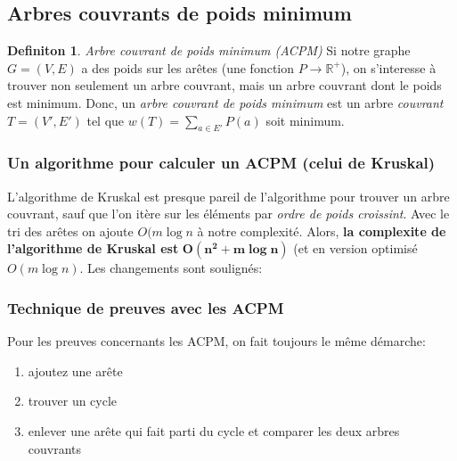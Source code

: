 \documentclass[french]{article}
\theoremstyle{definition}
\newtheorem{definition}{Definiton}[subsection]
\begin{document}
		\subsection{Arbres couvrants de poids minimum}
		\begin{definition}{\textit{Arbre couvrant de poids minimum (ACPM)}} Si notre graphe $G = (V, E)$ a des poids sur les arêtes (une fonction $P \to \mathbb{R}^+$), on s'interesse à trouver non seulement un arbre couvrant, mais un arbre couvrant dont le poids est minimum. Donc, un \textit{arbre couvrant de poids minimum} est un arbre \textit{couvrant} $T = (V', E')$ tel que $w(T) = \sum_{a \in E'}{P(a)}$ soit minimum.
		\end{definition}

		\subsubsection{Un algorithme pour calculer un ACPM (celui de Kruskal)}

		L'algorithme de Kruskal est presque pareil de l'algorithme pour trouver un arbre couvrant, sauf que l'on itère sur les éléments par \textit{ordre de poids croissint}. Avec le tri des arêtes on ajoute $O(m \log n$ à notre complexité. Alors, \textbf{la complexite de l'algorithme de Kruskal est} $\mathbf{O(n^2 + m \log n)}$ (et en version optimisé $O(m \log n)$. Les changements sont soulignés:
		\\
		\begin{algorithmic}
			\ENDFOR
					\ENDIF
				\ENDFOR
				\ENDIF
			\ENDFOR
		\end{algorithmic}

		\subsubsection{Technique de preuves avec les ACPM}
		Pour les preuves concernants les ACPM, on fait toujours le même démarche:
		\begin{enumerate}
			\item ajoutez une arête
			\item trouver un cycle
			\item enlever une arête qui fait parti du cycle et comparer les deux arbres couvrants
		\end{enumerate}\
\end{document}
